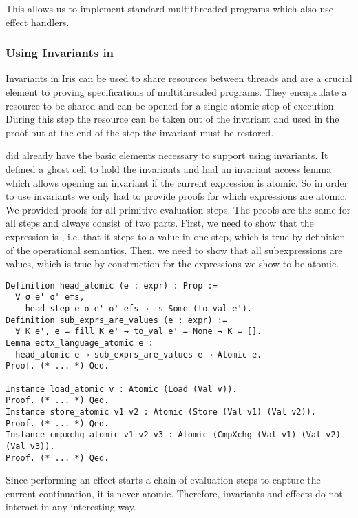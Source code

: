 This allows us to implement standard multithreaded programs which also use effect handlers.

\subsubsection*{Using Invariants in \hazel{}}

Invariants in Iris can be used to share resources between threads and are a crucial element to proving specifications of multithreaded programs.
They encapsulate a resource to be shared and can be opened for a single atomic step of execution.
During this step the resource can be taken out of the invariant and used in the proof but at the end of the step the invariant must be restored.

\hazel{} did already have the basic elements necessary to support using invariants.
It defined a ghost cell to hold the invariants and had an invariant access lemma which allows opening an invariant if the current expression is atomic.
So in order to use invariants we only had to provide proofs for which expressions are atomic.
We provided proofs for all primitive evaluation steps.
The proofs are the same for all steps and always consist of two parts.
First, we need to show that the expression is , i.e. that it steps to a value in one step, which is true by definition of the operational semantics.
Then, we need to show that all subexpressions are values, which is true by construction for the expressions we show to be atomic.
%
\begin{verbatim}
Definition head_atomic (e : expr) : Prop :=
  ∀ σ e' σ' efs,
    head_step e σ e' σ' efs → is_Some (to_val e').
Definition sub_exprs_are_values (e : expr) :=
  ∀ K e', e = fill K e' → to_val e' = None → K = [].
Lemma ectx_language_atomic e :
  head_atomic e → sub_exprs_are_values e → Atomic e.
Proof. (* ... *) Qed.

Instance load_atomic v : Atomic (Load (Val v)). 
Proof. (* ... *) Qed.
Instance store_atomic v1 v2 : Atomic (Store (Val v1) (Val v2)). 
Proof. (* ... *) Qed.
Instance cmpxchg_atomic v1 v2 v3 : Atomic (CmpXchg (Val v1) (Val v2) (Val v3)). 
Proof. (* ... *) Qed.
\end{verbatim}
%
Since performing an effect starts a chain of evaluation steps to capture the current continuation, it is never atomic.
Therefore, invariants and effects do not interact in any interesting way.
